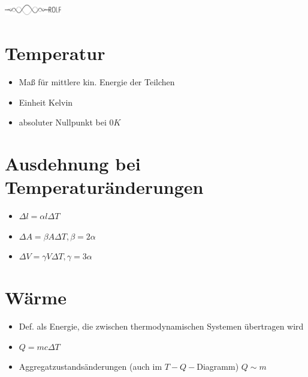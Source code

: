 \documentclass[a4paper,12pt]{extarticle}
\theoremstyle{problemstyle}
\begin{document}

\begin{multicols}{2}
\parbox{2.5cm}{\includegraphics[width=2.5cm]{../task/images/logo_scaled.pdf}}
\parbox{4.5cm}{}
\section*{Temperatur}
\begin{itemize}
\item Maß für mittlere kin. Energie der Teilchen
\item Einheit Kelvin
\item absoluter Nullpunkt bei $0K$
\end{itemize}
\section*{Ausdehnung bei Temperaturänderungen}
\begin{itemize}
\item $\Delta l = \alpha l \Delta T$
\item $\Delta A = \beta A \Delta T, \beta = 2 \alpha$
\item $\Delta V = \gamma V \Delta T, \gamma = 3 \alpha$
\end{itemize}
\section*{Wärme}
\begin{itemize}

\item Def. als Energie, die zwischen thermodynamischen Systemen übertragen wird\\
\item $Q = mc \Delta T$\\
\item Aggregatzustandsänderungen (auch im $T-Q-$Diagramm) $Q \sim m $
\end{itemize}

\end{multicols}
\end{document}
